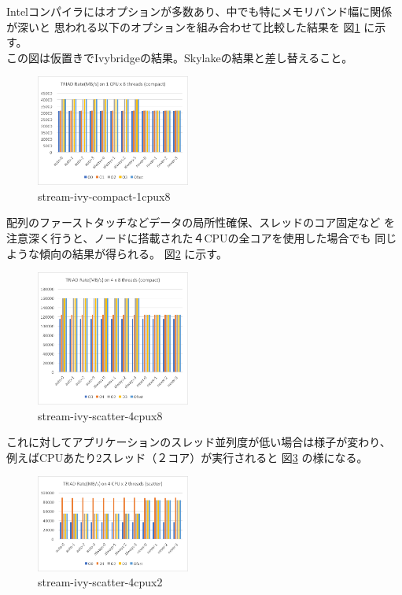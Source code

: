 \documentclass[submit,techrep,noauthor]{ipsj}
\begin{document}
Intelコンパイラにはオプションが多数あり、中でも特にメモリバンド幅に関係が深いと
思われる以下のオプションを組み合わせて比較した結果を
図\ref{fig:stream-ivy-compact-1cpux8} に示す。\\
{\color{blue}この図は仮置きでIvybridgeの結果。Skylakeの結果と差し替えること。}

\begin{figure}[tb]
\centering\includegraphics[width=0.45\textwidth]{figs/stream-ivy-compact-1cpux8.png}
\caption{stream-ivy-compact-1cpux8}
\label{fig:stream-ivy-compact-1cpux8}
\end{figure}


配列のファーストタッチなどデータの局所性確保、スレッドのコア固定など
を注意深く行うと、ノードに搭載された４CPUの全コアを使用した場合でも
同じような傾向の結果が得られる。
図\ref{fig:stream-ivy-scatter-4cpux8} に示す。\\

\begin{figure}[tb]
\centering\includegraphics[width=0.45\textwidth]{figs/stream-ivy-scatter-4cpux8.png}
\caption{stream-ivy-scatter-4cpux8}
\label{fig:stream-ivy-scatter-4cpux8}
\end{figure}

これに対してアプリケーションのスレッド並列度が低い場合は様子が変わり、
例えばCPUあたり2スレッド（２コア）が実行されると
図\ref{fig:stream-ivy-scatter-4cpux2} の様になる。\\

\begin{figure}[tb]
\centering\includegraphics[width=0.45\textwidth]{figs/stream-ivy-scatter-4cpux2.png}
\caption{stream-ivy-scatter-4cpux2}
\label{fig:stream-ivy-scatter-4cpux2}
\end{figure}
\end{document}
